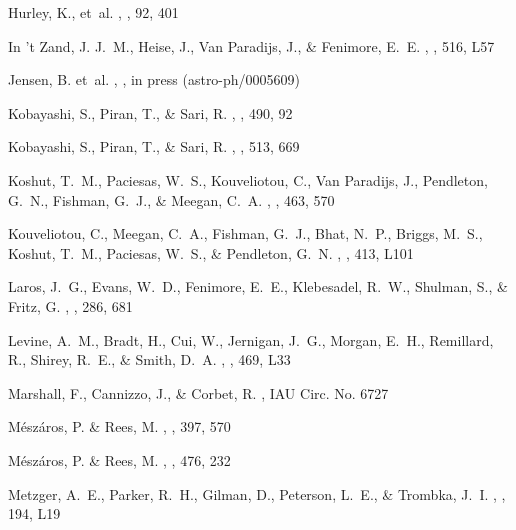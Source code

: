 \documentclass{aastex}
\begin{document}
\begin{multicols}{2}
\begin{thebibliography}{}
 {Hurley}, K., et~al.
, \aaps, 92, 401

{In 't Zand}, J. J.~M., {Heise}, J., {Van Paradijs}, J., \& {Fenimore}, E.~E.
, \apjl, 516, L57

Jensen, B. et~al.
, \aap, in press (astro-ph/0005609)

Kobayashi, S., Piran, T., \& Sari, R.
, \apj, 490, 92

Kobayashi, S., Piran, T., \& Sari, R.
, \apj, 513, 669

{Koshut}, T.~M., {Paciesas}, W.~S., {Kouveliotou}, C., {Van Paradijs}, J.,
  {Pendleton}, G.~N., {Fishman}, G.~J., \& {Meegan}, C.~A.
, \apj, 463, 570

{Kouveliotou}, C., {Meegan}, C.~A., {Fishman}, G.~J., {Bhat}, N.~P., {Briggs},
  M.~S., {Koshut}, T.~M., {Paciesas}, W.~S., \& {Pendleton}, G.~N.
, \apjl, 413, L101

{Laros}, J.~G., {Evans}, W.~D., {Fenimore}, E.~E., {Klebesadel}, R.~W.,
  {Shulman}, S., \& {Fritz}, G.
, \apj, 286, 681

{Levine}, A.~M., {Bradt}, H., {Cui}, W., {Jernigan}, J.~G., {Morgan}, E.~H.,
  {Remillard}, R., {Shirey}, R.~E., \& {Smith}, D.~A.
, \apjl, 469, L33

Marshall, F., Cannizzo, J., \& Corbet, R.
, IAU Circ. No. 6727

M\'{e}sz\'{a}ros, P. \& Rees, M.
, \apj, 397, 570

M\'{e}sz\'{a}ros, P. \& Rees, M.
, \apj, 476, 232

{Metzger}, A.~E., {Parker}, R.~H., {Gilman}, D., {Peterson}, L.~E., \&
  {Trombka}, J.~I.
, \apjl, 194, L19


\end{thebibliography}
\end{multicols}
\end{document}
